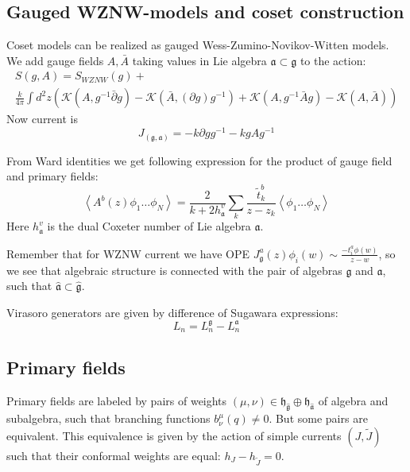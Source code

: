 \documentclass[12pt]{article}
\theoremstyle{definition}
\newcommand{\gf}{\mathfrak{g}}
\newcommand{\af}{\mathfrak{a}}
\newcommand{\hf}{\mathfrak{h}}
\newcommand{\gfh}{\hat{\mathfrak{g}}}
\newcommand{\afh}{\hat{\mathfrak{a}}}
\theoremstyle{definition} \newtheorem{Def}{Definition}
\begin{document}
\subsection{Gauged WZNW-models and coset construction}

Coset models can be realized as gauged Wess-Zumino-Novikov-Witten models. We add gauge fields  $A, \bar{A}$ taking values in Lie algebra $\af\subset \gf$ to the action:
\begin{multline*}
  S(g,A)=S_{WZNW}(g)+\\
  \frac{k}{4\pi}\int d^{2}z \left(\mathcal{K}(A, g^{-1}\bar \partial g)-\mathcal{K}(\bar A, (\partial g ) g^{-1})+\mathcal{K}(A,g^{-1}\bar A g)-\mathcal{K}(A,\bar A)\right)
\end{multline*}
Now current is
\begin{equation*}
  J_{(\gf,\af)}=-k\partial g g^{-1} -k g A g^{-1}
\end{equation*}

From Ward identities we get following expression for the product of gauge field and primary fields:
\begin{equation*}
  \left< A^{b}(z)\phi_{1}\dots \phi_{N}\right>=\frac{2}{k+2 h^{v}_{\af}}\sum_{k}\frac{\tilde{t}^{b}_{k}}{z-z_{k}}\left<\phi_{1}\dots \phi_{N}\right>
\end{equation*}
Here $h_{\af}^{v}$ is the dual Coxeter number of Lie algebra $\af$.

Remember that for WZNW current we have OPE $J_{\gf}^{a}(z)\phi_{i}(w)\sim \frac{-t^{a}_{i}\phi(w)}{z-w}$,  so we see that algebraic structure is connected with the pair of algebras $\gf$ and $\af$, such that $\afh\subset\gfh$. 

Virasoro generators are given by difference of Sugawara expressions:
\begin{equation*}
  L_{n}=L_{n}^{\gf}-L_{n}^{\af}
\end{equation*}

\subsection{Primary fields}
\label{sec:primary-fields}
Primary fields are labeled by pairs of weights $(\mu,\nu)\in \hf_{\gfh}\oplus \hf_{\afh}$  of algebra and subalgebra, such that branching functions $b^{\mu}_{\nu}(q)\neq 0$. But some pairs are equivalent. This equivalence is given by the action of simple currents $(J,\tilde{J})$ such that their conformal weights are equal:  $h_{J}-h_{\tilde{J}}=0$. 
\end{document}
